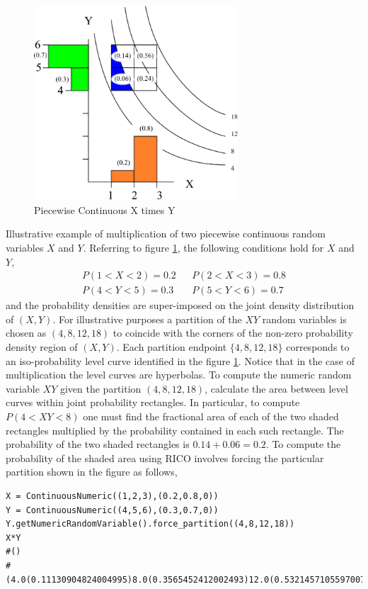 \begin{figure}
  \centering
  \includegraphics[width=3in]{Images/AxB_partitioned.eps}
  \caption[Piecewise Continuous X times Y]
          {Piecewise Continuous X times Y}
  \label{fig:AxB_Partitioned}
\end{figure}

Illustrative example of multiplication of two piecewise continuous random variables $X$ and $Y$.  Referring to figure \ref{fig:AxB_Partitioned}, the following conditions hold for $X$ and $Y$,
\begin{align*}
P(1 < X < 2) = 0.2 && P(2 < X < 3) = 0.8\\
P(4 < Y < 5) = 0.3 && P(5 < Y < 6) = 0.7
\end{align*}
and the probability densities are super-imposed on the joint density distribution of $(X,Y)$. For illustrative purposes a partition of the $XY$ random variables is chosen as $(4,8,12,18)$ to coincide with the corners of the non-zero probability density region of $(X,Y)$. Each partition endpoint $\{4,8,12,18\}$ corresponds to an iso-probability level curve identified in the figure \ref{fig:AxB_Partitioned}. Notice that in the case of multiplication the level curves are hyperbolas. To compute the numeric random variable $XY$ given the partition $(4,8,12,18)$, calculate the area between level curves within joint probability rectangles. In particular, to compute $P(4 < XY < 8)$ one must find the fractional area of each of the two shaded rectangles multiplied by the probability contained in each such rectangle. The probability of the two shaded rectangles is $0.14 + 0.06 = 0.2$. To compute the probability of the shaded area using RICO involves forcing the particular partition shown in the figure as follows,
\begin{lstlisting}
X = ContinuousNumeric((1,2,3),(0.2,0.8,0))
Y = ContinuousNumeric((4,5,6),(0.3,0.7,0))
Y.getNumericRandomVariable().force_partition((4,8,12,18))
X*Y
#()
#(4.0(0.11130904824004995)8.0(0.3565452412002493)12.0(0.5321457105597007)18.0,)
\end{lstlisting}

